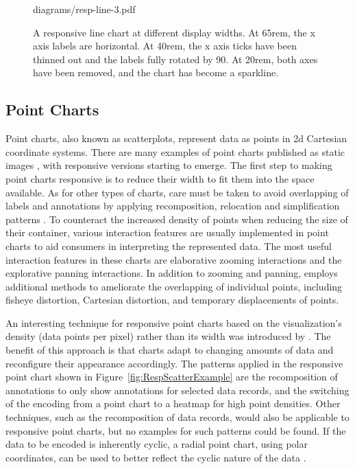 \begin{figure}[tp]
{{diagrams/resp-line-3.pdf}%
\label{fig:RespLineExample3}%
}
\caption[Responsive Line Chart Example]
{
A responsive line chart at different display widths.
 At 65rem, the x axis labels are
horizontal.  At 40rem, the x axis ticks
have been thinned out and the labels fully rotated by 90\textdegree.
 At 20rem, both axes have been removed,
and the chart has become a sparkline.
}
\label{fig:RespLineExample}
\end{figure}









\subsection{Point Charts}
\label{sec:ScatterplotExamples}

Point charts, also known as scatterplots, represent data as points in
2d Cartesian coordinate systems. There are many examples of
point charts published as static images \parencite{Scatter,Scatter2},
with responsive versions starting to emerge. The first step to making
point charts responsive is to reduce their width to fit them into the
space available. As for other types of charts, care must be taken to
avoid overlapping of labels and annotations by applying recomposition,
relocation and simplification patterns
\parencite{RespScatter,RespScatter2}. To counteract the increased
density of points when reducing the size of their container, various
interaction features are usually implemented in point charts to aid
consumers in interpreting the represented data. The most useful
interaction features in these charts are elaborative zooming
interactions and the explorative panning interactions. In addition to
zooming and panning, \textcite{RespVis} employs additional methods to
ameliorate the overlapping of individual points, including fisheye
distortion, Cartesian distortion, and temporary displacements of
points.

An interesting technique for responsive point charts based on the
visualization's density (data points per pixel) rather than its width
was introduced by \textcite{NickRabinowitzRDV}. The benefit of this
approach is that charts adapt to changing amounts of data and
reconfigure their appearance accordingly. The patterns applied in the
responsive point chart shown in Figure~\ref{fig:RespScatterExample}
are the recomposition of annotations to only show annotations for
selected data records, and the switching of the encoding from a point
chart to a heatmap for high point densities. Other techniques, such as
the recomposition of data records, would also be applicable to
responsive point charts, but no examples for such patterns could be
found. If the data to be encoded is inherently cyclic, a radial point
chart, using polar coordinates, can be used to better reflect the
cyclic nature of the data \parencite{RespRadialScatterHLine}.



